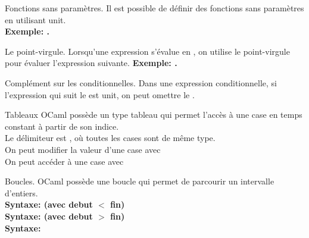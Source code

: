\documentclass[french, 11pt]{article}
\begin{document}
\vspace*{-0.3cm}

\begin{defi}{Fonctions sans paramètres.}{}
    Il est possible de définir des fonctions sans paramètres en utilisant unit.\\
    \bf{Exemple:} .
\end{defi}

\vspace*{-0.3cm}

\begin{defi}{Le point-virgule.}{}
    Lorsqu'une expression s'évalue en \ocaml{()}, on utilise le point-virgule pour évaluer l'expression suivante.\n
    \bf{Exemple:} .
\end{defi}

\vspace*{-0.3cm}

\begin{defi}{Complément sur les conditionnelles.}{}
    Dans une expression conditionnelle, si l'expression qui suit le  est unit, on peut omettre le .
\end{defi}

\vspace*{-0.3cm}

\begin{defi}{Tableaux}{}
    OCaml possède un type tableau qui permet l'accès à une case en temps constant à partir de son indice.\\
    Le délimiteur est \ocaml{[|e1; e2; ...|]}, où toutes les cases sont de même type.\\
    On peut modifier la valeur d'une case avec \\
    On peut accéder à une case avec 
\end{defi}

\vspace*{-0.3cm}

\begin{defi}{Boucles.}{}
    OCaml possède une boucle  qui permet de parcourir un intervalle d'entiers.\\
    \bf{Syntaxe:}  (avec debut $<$ fin)\\
    \bf{Syntaxe:}  (avec debut $>$ fin)\\
    \bf{Syntaxe:} 
\end{defi}

\fin
\end{document}
